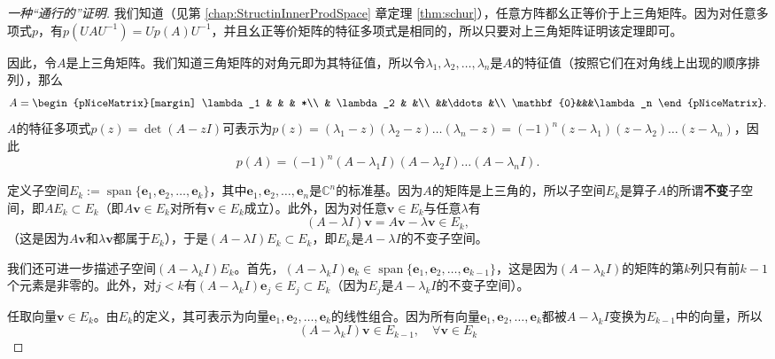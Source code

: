 \begin{proof}[一种“通行的”证明]
    我们知道（见第 \ref{chap:StructinInnerProdSpace} 章定理 \ref{thm:schur}），任意方阵都幺正等价于上三角矩阵。因为对任意多项式$p$，有$p(UAU^{-1})=Up(A)U^{-1}$，并且幺正等价矩阵的特征多项式是相同的，所以只要对上三角矩阵证明该定理即可。

    因此，令$A$是上三角矩阵。我们知道三角矩阵的对角元即为其特征值，所以令$\lambda_1,\lambda_2,\dots,\lambda_n$是$A$的特征值（按照它们在对角线上出现的顺序排列），那么
    \[A=\begin{pNiceMatrix}[margin]
        \lambda_1 & & & *\\
         & \lambda_2 & &\\
         &&\ddots&\\
         \mathbf{0}&&&\lambda_n
    \end{pNiceMatrix}.\]
    $A$的特征多项式$p(z)=\det(A-z I)$可表示为$p(z)=(\lambda_1-z)(\lambda_2-z)\dots(\lambda_n-z)=(-1)^n(z-\lambda_1)(z-\lambda_2)\dots(z-\lambda_n)$，因此
    \[p(A)=(-1)^n(A-\lambda_1I)(A-\lambda_2I)\ldots(A-\lambda_nI).\]

    定义子空间$E_k:=\operatorname{span}\{\mathbf{e}_1,\mathbf{e}_2,\dots,\mathbf{e}_k\}$，其中$\mathbf{e}_1,\mathbf{e}_2,\dots,\mathbf{e}_n$是$\mathbb{C}^n$的标准基。因为$A$的矩阵是上三角的，所以子空间$E_k$是算子$A$的所谓{\bf 不变}子空间，即$AE_k\subset E_k$（即$A\mathbf{v}\in E_k$对所有$\mathbf{v}\in E_k$成立）。此外，因为对任意$\mathbf{v}\in E_k$与任意$\lambda$有\[(A-\lambda I)\mathbf{v}=A\mathbf{v}-\lambda \mathbf{v}\in E_k,\]
    （这是因为$A\mathbf{v}$和$\lambda \mathbf{v}$都属于$E_k$），于是$(A-\lambda I)E_k\subset E_k$，即$E_k$是$A-\lambda I$的不变子空间。

    我们还可进一步描述子空间$(A-\lambda_k I)E_k$。首先，$(A-\lambda_k I)\mathbf{e}_k\in$\linebreak $\operatorname{span}\{\mathbf{e}_1,\mathbf{e}_2,\dots,\mathbf{e}_{k-1}\}$，这是因为$(A-\lambda_k I)$的矩阵的第$k$列只有前$k-1$个元素是非零的。此外，对$j<k$有$(A-\lambda_k I)\mathbf{e}_j\in E_j\subset E_k$（因为$E_j$是$A-\lambda_k I$的不变子空间）。

    任取向量$\mathbf{v}\in E_k$。由$E_k$的定义，其可表示为向量$\mathbf{e}_1,\mathbf{e}_2,\dots,\mathbf{e}_k$的线性组合。因为所有向量$\mathbf{e}_1,\mathbf{e}_2,\dots,\mathbf{e}_k$都被$A-\lambda_k I$变换为$E_{k-1}$中的向量，所以
    \begin{equation}\label{triangle_invariant}
        (A-\lambda_k I)\mathbf{v}\in E_{k-1},\quad \forall\mathbf{v}\in E_k
    \end{equation}


\end{proof}
